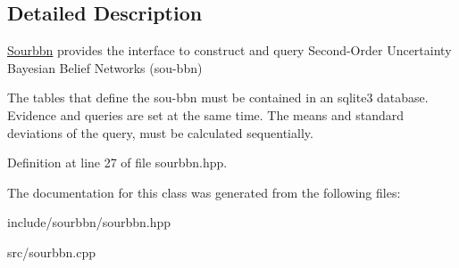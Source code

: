 \subsection{Detailed Description}
\hyperlink{classsourbbn_1_1Sourbbn}{Sourbbn} provides the interface to construct and query Second-\/\+Order Uncertainty Bayesian Belief Networks (sou-\/bbn)

The tables that define the sou-\/bbn must be contained in an sqlite3 database. Evidence and queries are set at the same time. The means and standard deviations of the query, must be calculated sequentially. 

Definition at line 27 of file sourbbn.\+hpp.



The documentation for this class was generated from the following files\+:\begin{DoxyCompactItemize}
\item 
include/sourbbn/sourbbn.\+hpp\item 
src/sourbbn.\+cpp\end{DoxyCompactItemize}
